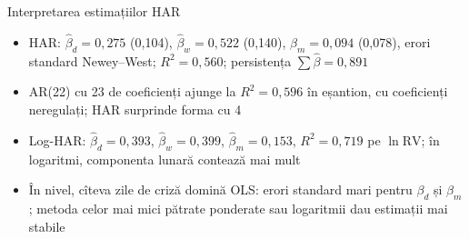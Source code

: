 \begin{frame}{Interpretarea estimațiilor HAR}
\itemsize{\small}
\begin{itemize}
    \item HAR: $\hat\beta_d = 0{,}275$ (0{,}104), $\hat\beta_w = 0{,}522$ (0{,}140), $\hat\beta_m = 0{,}094$ (0{,}078), erori standard Newey--West; $R^2 = 0{,}560$; persistența $\sum\hat\beta = 0{,}891$
    \item AR(22) cu 23 de coeficienți ajunge la $R^2 = 0{,}596$ în eșantion, cu coeficienți neregulați; HAR surprinde forma cu 4
    \item Log-HAR: $\hat\beta_d = 0{,}393$, $\hat\beta_w = 0{,}399$, $\hat\beta_m = 0{,}153$, $R^2 = 0{,}719$ pe $\ln\mathrm{RV}$; în logaritmi, componenta lunară contează mai mult
    \item În nivel, cîteva zile de criză domină OLS: erori standard mari pentru $\beta_d$ și $\beta_m$; metoda celor mai mici pătrate ponderate sau logaritmii dau estimații mai stabile
\end{itemize}
\end{frame}

